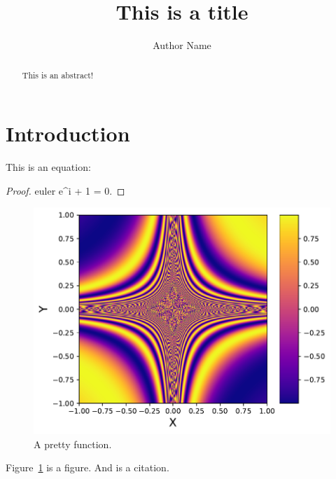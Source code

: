 \documentclass[modern]{aastex61}
\begin{document}
\title{This is a title}

\author{Author Name}


\begin{abstract}
This is an abstract!
\end{abstract}

\section{Introduction}
\label{sec:intro}

This is an equation:

\begin{proof}{euler}
    \label{eq:euler}
    e^{i\pi} + 1 = 0.
\end{proof}

\begin{figure}[t!]
    \begin{centering}
    \includegraphics[width=0.5\linewidth]{figures/pretty_function.pdf}
    \caption{\label{fig:pretty_function}
             A pretty function.
             }
    \end{centering}
\end{figure}

Figure~\ref{fig:pretty_function} is a figure. And \citet{Luger2018} is
a citation.


\end{document}
